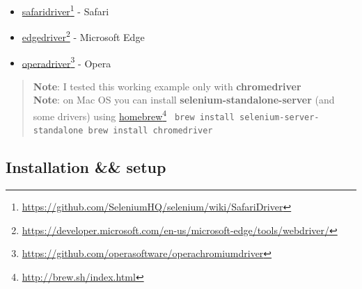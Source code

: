 \begin{itemize}
\begin{itemize}
\item \href{https://github.com/SeleniumHQ/selenium/wiki/SafariDriver}{safaridriver}\footnote{\href{https://github.com/SeleniumHQ/selenium/wiki/SafariDriver}{https:/\slash github.com\slash SeleniumHQ\slash selenium\slash wiki\slash SafariDriver}} - Safari

\item \href{https://developer.microsoft.com/en-us/microsoft-edge/tools/webdriver/}{edgedriver}\footnote{\href{https://developer.microsoft.com/en-us/microsoft-edge/tools/webdriver/}{https:/\slash developer.microsoft.com\slash en-us\slash microsoft-edge\slash tools\slash webdriver\slash }} - Microsoft Edge

\item \href{https://github.com/operasoftware/operachromiumdriver}{operadriver}\footnote{\href{https://github.com/operasoftware/operachromiumdriver}{https:/\slash github.com\slash operasoftware\slash operachromiumdriver}} - Opera

\end{itemize}

\end{itemize}

\begin{quote}
\textbf{Note}: I tested this working example only with \textbf{chromedriver}\\
\textbf{Note}: on Mac OS you can install \textbf{selenium-standalone-server} (and some drivers) using \href{http://brew.sh/index.html}{homebrew}\footnote{\href{http://brew.sh/index.html}{http:/\slash brew.sh\slash index.html}}
\texttt{
brew install selenium-server-standalone
brew install chromedriver
}
\end{quote}

\subsection{Installation \&\& setup}
\label{installationsetup}

